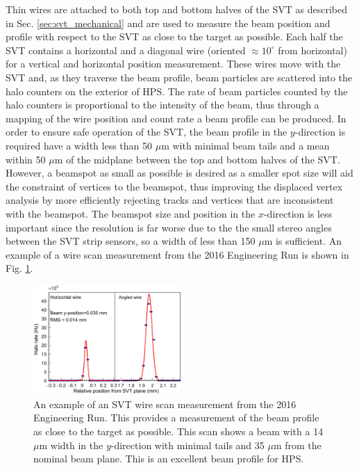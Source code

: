Thin wires are attached to both top and bottom halves of the SVT as described in Sec. \ref{sec:svt_mechanical} and are used to measure the beam position and profile with respect to the SVT as close to the target as possible. Each half the SVT contains a horizontal and a diagonal wire (oriented $\approx 10^{\circ}$ from horizontal) for a vertical and horizontal position measurement. These wires move with the SVT and, as they traverse the beam profile, beam particles are scattered into the halo counters on the exterior of HPS. The rate of beam particles counted by the halo counters is proportional to the intensity of the beam, thus through a mapping of the wire position and count rate a beam profile can be produced. In order to ensure safe operation of the SVT, the beam profile in the $y$-direction is required have a width less than 50 $\mu$m with minimal beam tails and a mean within 50 $\mu$m of the midplane between the top and bottom halves of the SVT. However, a beamspot as small as possible is desired as a smaller spot size will aid the constraint of vertices to the beamspot, thus improving the displaced vertex analysis by more efficiently rejecting tracks and vertices that are inconsistent with the beamspot.  The beamspot size and position in the $x$-direction is less important since the resolution is far worse due to the the small stereo angles between the SVT strip sensors, so a width of less than 150 $\mu$m is sufficient. An example of a wire scan measurement from the 2016 Engineering Run is shown in Fig. \ref{fig:wirescan}.

\begin{figure}
    \centering
    \includegraphics[width=0.5\textwidth]{figs/detector/SVTwirescan.jpg}
    \caption{An example of an SVT wire scan measurement from the 2016 Engineering Run. This provides a measurement of the beam profile as close to the target as possible. This scan shows a beam with a 14 $\mu$m width in the $y$-direction with minimal tails and 35 $\mu$m from the nominal beam plane. This is an excellent beam profile for HPS.}
    \label{fig:wirescan}
\end{figure}


